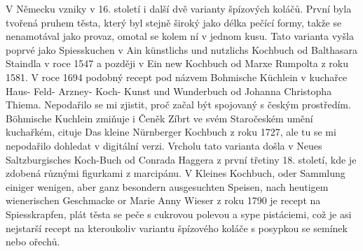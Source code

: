 V Německu vzniky v 16. století i další dvě varianty špízových koláčů. První byla tvořená pruhem těsta, který byl stejně široký jako délka pečící formy, takže se nenamotával jako provaz, omotal se kolem ní v jednom kusu. Tato varianta vyšla poprvé jako Spiesskuchen v Ain künstlichs und nutzlichs Kochbuch od Balthasara Staindla v roce 1547 a později v Ein new Kochbuch od Marxe Rumpolta z roku 1581. V roce 1694 podobný recept pod názvem Bohmische Küchlein v kuchařce Haus- Feld- Arzney- Koch- Kunst und Wunderbuch od Johanna Christopha Thiema. Nepodařilo se mi zjistit, proč začal být spojovaný s českým prostředím. Böhmische Kuchlein zmiňuje i Čeněk Zíbrt ve svém Staročeském umění kuchařkém, cituje Das kleine Nürnberger Kochbuch z roku 1727, ale tu se mi nepodařilo dohledat v digitální verzi. Vrcholu tato varianta došla v Neues Saltzburgisches Koch-Buch od Conrada Haggera z první třetiny 18. století, kde je zdobená různými figurkami z marcipánu. V Kleines Kochbuch, oder Sammlung einiger wenigen, aber ganz besondern ausgesuchten Speisen, nach heutigem wienerischen Geschmacke or Marie Anny Wieser z roku 1790 je recept na Spiesskrapfen, plát těsta se peče s cukrovou polevou a sype pistáciemi, což je asi nejstarší recept na kteroukoliv variantu špízového koláče s posypkou se semínek nebo ořechů.


